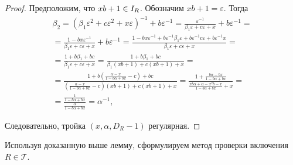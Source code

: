\documentclass[_00_dissertation.tex]{subfiles}
\begin{document}
\begin{proof}
    Предположим, что $xb + 1 \in I_{R}$.
    Обозначим $xb + 1 = \varepsilon$.
    Тогда
    \begin{equation*}
        \begin{split}
            \beta_2 = \left(
                \beta_1 \varepsilon^2 + c\varepsilon^2 + x\varepsilon
            \right)^{-1} + b\varepsilon^{-1} = \frac{
                \varepsilon^{-1}
            }{
                \beta_1 \varepsilon + c\varepsilon + x
            } + b\varepsilon^{-1} = \\
            = \frac{
                1 - bx\varepsilon^{-1}
            }{
                \beta_1 \varepsilon + c\varepsilon + x
            } + b\varepsilon^{-1} = \frac{
                1 - bx\varepsilon^{-1} + b\varepsilon^{-1}\beta_1 \varepsilon + b\varepsilon^{-1}c\varepsilon + b\varepsilon^{-1}x
            }{
                \beta_1 \varepsilon + c\varepsilon + x
            } = \\
            = \frac{
                1 + b\beta_1 + bc
            }{
                \beta_1 \varepsilon + c\varepsilon + x
            } = \frac{
                1 + b\beta_1 + bc
            }{
                \beta_1(xb + 1) + c(xb + 1) + x
            } = \\
            = \frac{
                1 + b\left(
                    \frac{\alpha - x}{1 - b\alpha + bx} - c
                \right) + bc
            }{
                \left(
                    \frac{\alpha - x}{1 - b\alpha + bx} - c
                \right)(xb + 1) + c(xb + 1) + x
            } = \frac{
                1 + \frac{b\alpha - bx}{1 - b\alpha + bx}
            }{
                \frac{xb\alpha + \alpha - x^2b - x}{1 - b\alpha + bx} + x
            } = \\
            = \frac{
                \frac{1}{1 - b\alpha + bx}
            }{
                \frac{\alpha}{1 - b\alpha + bx}
            } = \alpha^{-1},
        \end{split}
    \end{equation*}
    
    Следовательно, тройка $(x, \alpha, D_R - 1)$ регулярная.
\end{proof}

Используя доказанную выше лемму, сформулируем метод проверки включения $R \in \mathcal{T}$.
\end{document}
